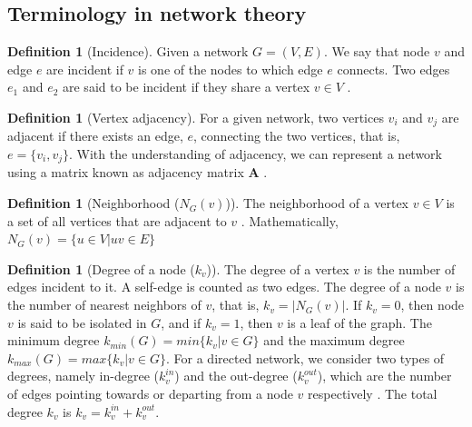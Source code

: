 \documentclass[10pt,a4paper]{article}
\theoremstyle{plain}
\theoremstyle{definition}
\newtheorem{lem}[subsection]{Lemma}
\newtheorem{defn}[subsection]{Definition}
\begin{document}
\subsection{Terminology in network theory}
\begin{defn}[Incidence]
	Given a network $G=(V,E)$. We say that node $v$ and edge $e$ are incident if $v$ is one of the nodes to which edge $e$ connects. Two edges $e_1$ and $e_2$ are said to be incident if they share a vertex $v\in V$ \citep{newman2010networks}. 
\end{defn}

\begin{defn}[Vertex adjacency]
	For a given network, two vertices $v_i$ and $v_j$ are adjacent if there exists an edge, $e$, connecting the two vertices, that is, $e = \{v_i,v_j\}$. With the understanding of adjacency, we can represent a network using a matrix known as adjacency matrix $\mathbf{A}$ \citep{newman2010networks}.
\end{defn}

\begin{defn}[Neighborhood ($N_G(v)$)]
	The neighborhood of a vertex $v \in V$ is a set of all vertices that are adjacent to $v$ \citep{newman2010networks}. Mathematically, $N_G(v) = \{u \in V \vert uv \in E \}$
\end{defn}

\begin{defn}[Degree of a node ($k_v$)]
	The degree of a vertex $v$ is the number of edges incident to it. A self-edge is counted as two edges. The degree of a node $v$ is the number of nearest neighbors of $v$, that is, $k_v = |N_G(v)|$. If $k_v = 0$, then node $v$ is said to be isolated in $G$, and if $k_v = 1$, then $v$ is a leaf of the graph. The minimum degree $k_{min}(G)= min\{k_v \vert v \in G\} $ and the maximum degree $k_{max}(G)= max\{k_v \vert v \in G\}$. For a directed network, we consider two types of degrees, namely in-degree ($k_v^{in}$) and the out-degree ($k_v^{out}$), which are the number of edges pointing towards or departing from a node $v$ respectively \citep{estrada2011structure}. The total degree $k_v$ is $k_v = k_v^{in}+ k_v^{out}$.
\end{defn} 

\end{document}
